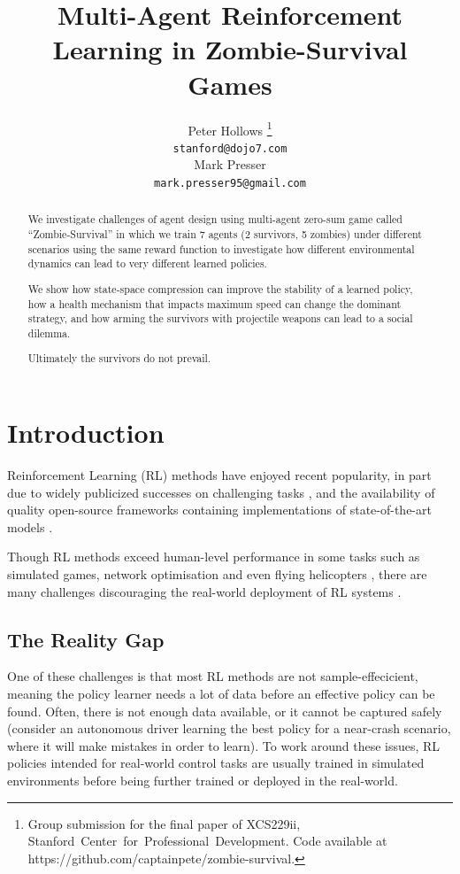 \documentclass[11pt,a4paper]{article}
\title{Multi-Agent Reinforcement Learning in Zombie-Survival Games}
\author{
  Peter Hollows
  \thanks {
    Group submission for the final paper of XCS229ii,
    \mbox{Stanford Center for Professional Development}.
    Code available at https://github.com/captainpete/zombie-survival.
  }
  \\ \texttt{stanford@dojo7.com} \\
  \And
  Mark Presser
  \footnotemark[1]
  \\ \texttt{mark.presser95@gmail.com} \\
}
\date{}
\begin{document}
\maketitle
\begin{abstract}
  We investigate challenges of agent design using
  multi-agent zero-sum game called ``Zombie-Survival'' 
  in which we train 7 agents (2 survivors, 5 zombies)
  under different scenarios using the same reward function
  to investigate how different environmental dynamics
  can lead to very different learned policies.

  We show how state-space compression can improve the stability of a learned policy,
  how a health mechanism that impacts maximum speed can change the dominant strategy,
  and how arming the survivors with projectile weapons can lead to a social dilemma.

  Ultimately the survivors do not prevail.
\end{abstract}

\section{Introduction}

Reinforcement Learning (RL) methods have enjoyed recent popularity,
in part due to widely publicized successes on challenging tasks \citep{Silver1140,badia2020agent57,alphastarblog,barth2018distributed},
and the availability of quality open-source frameworks containing implementations of state-of-the-art models \citep{1606.01540,hoffman2020acme,stable-baselines}.

Though RL methods exceed human-level performance in some tasks such as
simulated games, network optimisation \citep{chen2018auto,mao2019learning,valadarsky2017learning} and even flying helicopters \citep{abbeel2006application},
there are many challenges discouraging the real-world deployment of RL systems \citep{dulacarnold2019challenges}.

\subsection{The Reality Gap}

One of these challenges is that most RL methods are not sample-effecicient, meaning the policy learner needs a lot of data before an effective policy can be found.
Often, there is not enough data available, or it cannot be captured safely (consider an autonomous driver learning the best policy for a near-crash scenario, where it will make mistakes in order to learn).
To work around these issues, RL policies intended for real-world control tasks are usually trained in simulated environments before being further trained or deployed in the real-world.
\end{document}
